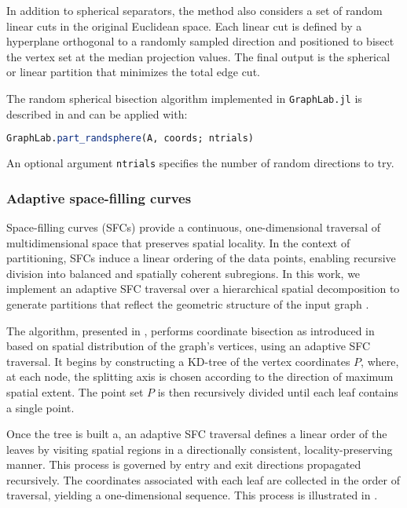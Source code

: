 \documentclass[../paper.tex]{subfiles}
\begin{document}
    In addition to spherical separators, the method also considers a set of random linear cuts in the original
    Euclidean space. Each linear cut is defined by a hyperplane
    orthogonal to a randomly sampled direction and positioned to
    bisect the vertex set at the median projection values.
    The final output is the spherical or linear partition that minimizes the total edge cut.

    The random spherical bisection algorithm implemented in \texttt{GraphLab.jl} is described in  and can be applied with:

    \begin{lstlisting}[language=Julia]
    GraphLab.part_randsphere(A, coords; ntrials)
    \end{lstlisting}

    An optional argument \texttt{ntrials} specifies the number of random directions to try.

    
    
    \subsubsection{Adaptive space-filling curves}
    \label{sub:sfc}
    Space-filling curves (SFCs) provide a continuous, one-dimensional traversal
    of multidimensional space that preserves spatial locality.
    In the context of partitioning, SFCs induce a linear ordering of the data
    points, enabling recursive division into balanced and spatially coherent subregions. In this work, we implement an adaptive SFC traversal over a
    hierarchical spatial decomposition to generate partitions that reflect the geometric structure of the input graph \cite{Sasidharan15, sasidharan2015space}.

    The algorithm, presented in , performs coordinate bisection as introduced in  based on spatial distribution of the graph's vertices, using an adaptive SFC traversal.
    It begins by constructing a KD-tree of the vertex coordinates $P$, where, at each node, the splitting axis is chosen according to the direction of maximum spatial extent. The point set $P$ is then recursively divided until each leaf contains a single point.

    Once the tree is built a, an adaptive SFC traversal defines a linear order of the leaves by visiting spatial regions in a directionally consistent, locality-preserving manner. This process is governed by entry and exit directions propagated recursively. The coordinates associated with each leaf are collected in the order of traversal, yielding a one-dimensional sequence.
    This process is illustrated in .
\end{document}
